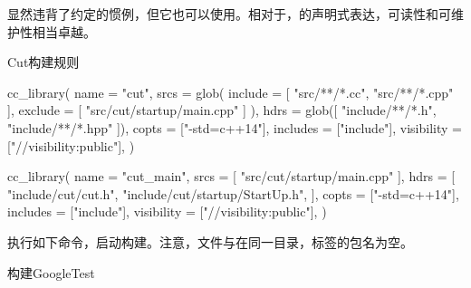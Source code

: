 \begin{content}
显然违背了约定的惯例，但它也可以使用。相对于，的声明式表达，可读性和可维护性相当卓越。

\begin{nodiff}{Cut构建规则}
 \begin{python}
cc_library(
  name = "cut",
  srcs = glob(
      include = [ 
          "src/**/*.cc",
          "src/**/*.cpp"
      ],  
      exclude = [ 
          "src/cut/startup/main.cpp"
      ]      
  ),  
  hdrs = glob([
      "include/**/*.h", "include/**/*.hpp"
  ]), 
  copts = ["-std=c++14"],
  includes = ["include"],
  visibility = ["//visibility:public"],
)

cc_library(
  name = "cut_main",
  srcs = [ 
      "src/cut/startup/main.cpp"
  ],  
  hdrs = [ 
      "include/cut/cut.h",
      "include/cut/startup/StartUp.h",
  ],                                                                                                                        
  copts = ["-std=c++14"],
  includes = ["include"],
  visibility = ["//visibility:public"],
)
 \end{python}
\end{nodiff}

执行如下命令，启动构建。注意，文件与在同一目录，标签的包名为空。

\begin{nodiff}{构建GoogleTest}
\end{nodiff}

\end{content}
